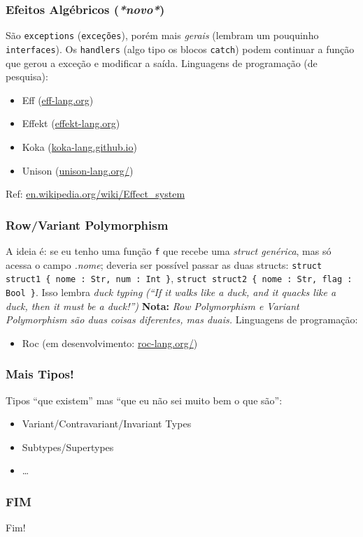 \documentclass{beamer}
\newcommand{\inlcode}[1]{\texttt{#1}}
\newcommand{\nota}[1]{\textbf{Nota:}\textit{ #1}}
\begin{document}
\begin{frame}
    \frametitle{Efeitos Algébricos (\emph{*novo*})}
    São \texttt{exceptions} (\texttt{exceções}),
    porém mais \emph{gerais}
    (lembram um pouquinho \texttt{interfaces}).
    \vfill
    Os \texttt{handlers} (algo tipo os blocos \texttt{catch})
    podem continuar a função que gerou a exceção e
    modificar a saída.
    \vfill
    Linguagens de programação (de pesquisa):
    \begin{itemize}
        \item Eff (\url{eff-lang.org})
        \item Effekt (\url{effekt-lang.org})
        \item Koka (\url{koka-lang.github.io})
        \item Unison (\url{unison-lang.org/})
    \end{itemize}
    \vfill
    Ref: \url{en.wikipedia.org/wiki/Effect_system}
\end{frame}

\begin{frame}
    \frametitle{Row/Variant Polymorphism}
    A ideia é: se eu tenho uma função \inlcode{f}
    que recebe uma \emph{struct genérica},
    mas só acessa o campo \emph{.nome};
    deveria ser possível passar as duas structs:
    \inlcode{struct struct1 \{ nome : Str, num : Int \}},
    \inlcode{struct struct2 \{ nome : Str, flag : Bool \}}.
    \vfill
    Isso lembra \emph{duck typing}
    \textit{(``If it walks like a duck,
    and it quacks like a duck,
    then it must be a duck!'')}
    \vfill
    \nota{Row Polymorphism e Variant Polymorphism são duas
    coisas diferentes, mas duais.}
    \vfill
    Linguagens de programação:
    \begin{itemize}
        \item Roc (em desenvolvimento: \url{roc-lang.org/})
    \end{itemize}
\end{frame}

\begin{frame}
    \frametitle{Mais Tipos!}
    Tipos ``que existem'' mas ``que eu não sei muito bem o que são'':
    \begin{itemize}
        \item Variant/Contravariant/Invariant Types
        \item Subtypes/Supertypes
        \item \dots
    \end{itemize}
\end{frame}

\begin{frame}
    \frametitle{FIM}
    Fim!
    \centering
\end{frame}
\end{document}
